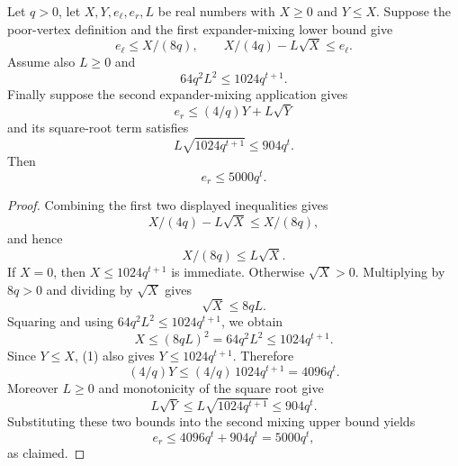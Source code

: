 \begin{helper}
Let \(q>0\), let \(X,Y,e_\ell,e_r,L\) be real numbers with \(X\ge0\) and
\(Y\le X\).  Suppose the poor-vertex definition and the first expander-mixing
lower bound give
\[
  e_\ell\le X/(8q),
  \qquad
  X/(4q)-L\sqrt X\le e_\ell.
\]
Assume also \(L\ge0\) and
\[
  64q^2L^2\le1024q^{t+1}.
\]
Finally suppose the second expander-mixing application gives
\[
  e_r\le (4/q)Y+L\sqrt Y
\]
and its square-root term satisfies
\[
  L\sqrt{1024q^{t+1}}\le904q^t.
\]
Then
\[
  e_r\le5000q^t.
\]
\end{helper}
\begin{proof}
Combining the first two displayed inequalities gives
\[
  X/(4q)-L\sqrt X\le X/(8q),
\]
and hence
\[
  X/(8q)\le L\sqrt X.
\]
If \(X=0\), then \(X\le1024q^{t+1}\) is immediate.  Otherwise
\(\sqrt X>0\).  Multiplying by \(8q>0\) and dividing by \(\sqrt X\) gives
\[
  \sqrt X\le 8qL.
\]
Squaring and using \(64q^2L^2\le1024q^{t+1}\), we obtain
\[
  X\le (8qL)^2=64q^2L^2\le1024q^{t+1}. \tag{1}
\]
Since \(Y\le X\), (1) also gives \(Y\le1024q^{t+1}\).  Therefore
\[
  (4/q)Y\le (4/q)\,1024q^{t+1}=4096q^t.
\]
Moreover \(L\ge0\) and monotonicity of the square root give
\[
  L\sqrt Y\le L\sqrt{1024q^{t+1}}\le904q^t.
\]
Substituting these two bounds into the second mixing upper bound yields
\[
  e_r\le4096q^t+904q^t=5000q^t,
\]
as claimed.
\end{proof}
